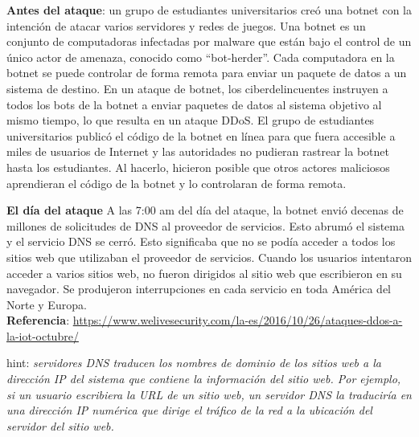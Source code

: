 \begin{tcolorbox}[colback=gray!5!white,colframe=orange!60!gray,title=caso 1]
\textbf{Antes del ataque}: un grupo de estudiantes universitarios creó una botnet con la intención de atacar varios servidores y redes de juegos. Una botnet es un conjunto de computadoras infectadas por malware que están bajo el control de un único actor de amenaza, conocido como ``bot-herder''. Cada computadora en la botnet se puede controlar de forma remota para enviar un paquete de datos a un sistema de destino. En un ataque de botnet, los ciberdelincuentes instruyen a todos los bots de la botnet a enviar paquetes de datos al sistema objetivo al mismo tiempo, lo que resulta en un ataque DDoS.
%
El grupo de estudiantes universitarios publicó el código de la botnet en línea para que fuera accesible a miles de usuarios de Internet y las autoridades no pudieran rastrear la botnet hasta los estudiantes. Al hacerlo, hicieron posible que otros actores maliciosos aprendieran el código de la botnet y lo controlaran de forma remota. 

\textbf{El día del ataque}
A las 7:00 am del día del ataque, la botnet envió decenas de millones de solicitudes de DNS al proveedor de servicios. Esto abrumó el sistema y el servicio DNS se cerró. Esto significaba que no se podía acceder a todos los sitios web que utilizaban el proveedor de servicios. Cuando los usuarios intentaron acceder a varios sitios web, no fueron dirigidos al sitio web que escribieron en su navegador. Se produjeron interrupciones en cada servicio en toda América del Norte y Europa. \\ \textbf{Referencia}: \url{https://www.welivesecurity.com/la-es/2016/10/26/ataques-ddos-a-la-iot-octubre/} 
\end{tcolorbox}

hint: \textit{servidores DNS traducen los nombres de dominio de los sitios web a la dirección IP del sistema que contiene la información del sitio web. Por ejemplo, si un usuario escribiera la URL de un sitio web, un servidor DNS la traduciría en una dirección IP numérica que dirige el tráfico de la red a la ubicación del servidor del sitio web.}





